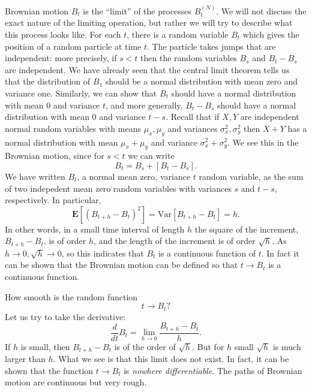 \documentclass{stml-l}
\theoremstyle{definition}
\numberwithin{equation}{chapter}
\numberwithin{figure}{chapter}
\numberwithin{figure}{section}
\begin{document}
Brownian motion $B_{t}$ is the ``limit'' of the processes
$B_{t}^{(N)}$. We will not discuss the exact nature of the limiting
operation, but rather we will try to describe what this process
looks like. For each $t$, there is a random variable $B_{t}$ which
gives the position of a random particle at time $t$. The particle
takes jumps that are independent: more precisely, if $s<t$ then the
random variables $B_{s}$ and $B_{t}-B_{s}$ are independent. We have
already seen that the central limit theorem tells us that the
distribution of $B_{1}$ should be a normal distribution with mean
zero and variance one. Similarly, we can show that $B_{t}$ should
have a normal distribution with mean $0$ and variance $t$, and more
generally, $B_{t}-B_{s}$ should have a normal distribution with mean
$0$ and variance $t-s$. Recall that if $X,Y$ are independent normal
random variables with means $\mu_{x},\mu_{y}$ and variances
$\sigma_{x}^{2},\sigma_{y}^{2}$ then $X+Y$ has a normal distribution
with mean $\mu_{x}+\mu_{y}$ and variance
$\sigma_{x}^{2}+\sigma_{y}^{2}$. We see this in the Brownian motion,
since for $s<t$ we can write
\begin{equation*}
B_{t}=B_{s}+[B_{t}-B_{s}].
\end{equation*}
We have written $B_{t}$, a normal mean zero, variance $t$ random
variable, as the sum of two indepedent mean zero random variables
with variances $s$ and $t-s$, respectively. In particular,
\begin{equation*}
\mathbf{E}[(B_{t+h}-B_{t})^{2}]= \mathrm{Var}[B_{t+h}-B_{t}]=h.
\end{equation*}
In other words, in a small time interval of length $h$ the square of
the increment, $B_{t+h}-B_{t}$, is of order $h$, and the length of
the increment is of order $\sqrt{h}$. As $h\rightarrow
0,\sqrt{h}\rightarrow 0$, so this indicates that $B_{t}$ is a
continuous function of $t$. In fact it can be shown that the
Brownian motion can be defined so that $t\rightarrow B_{t}$ is a
continuous function.

How smooth is the random function
\begin{equation*}
t\rightarrow B_{t}?
\end{equation*}
Let us try to take the derivative:
\begin{equation*}
\frac{d}{dt}B_{t}=\lim\limits_{h\rightarrow
0}\frac{B_{t+h}-B_{t}}{h}.
\end{equation*}
If $h$ is small, then $B_{t+h}-B_{t}$ is of the order of $\sqrt{h}$.
But for $h$ small $\sqrt{h}$ is much larger than $h$. What we see is
that this limit does not exist. In fact, it can be shown that the
function $t\rightarrow B_{t}$ is \emph{nowhere differentiable}. The
paths of Brownian motion are continuous but very rough.
\end{document}
